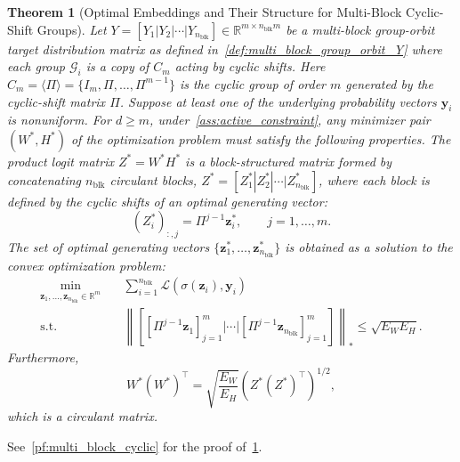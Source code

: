\documentclass[11pt]{article}
\newtheorem{theorem}{Theorem}
\begin{document}
\begin{theorem}[Optimal Embeddings and Their Structure for Multi-Block Cyclic-Shift Groups]
\label{thm:multi_block_cyclic}
Let \( Y = [Y_1 | Y_2 | \cdots | Y_{n_{\mathrm{blk}}}] \in \mathbb{R}^{m \times n_{\mathrm{blk}}m} \) be a multi-block group-orbit target distribution matrix as defined in~\cref{def:multi_block_group_orbit_Y} where each group \( \mathcal G_i \) is a copy of \(C_m\) acting by cyclic shifts.
Here \(C_m=\langle\Pi\rangle=\{I_m,\Pi,\ldots,\Pi^{m-1}\}\) is the cyclic group of order \(m\) generated by the cyclic-shift matrix \(\Pi\).
Suppose at least one of the underlying probability vectors \(\boldsymbol{y}_i\) is nonuniform. For \(d \ge m\), under~\cref{ass:active_constraint}, any minimizer pair \((W^*,H^*)\) of the optimization problem must satisfy the following properties.
The product logit matrix \(Z^*=W^*H^*\) is a block-structured matrix formed by concatenating \(n_{\mathrm{blk}}\) circulant blocks, \(Z^* = [Z_1^* | Z_2^* | \cdots | Z_{n_{\mathrm{blk}}}^*]\), where each block is defined by the cyclic shifts of an optimal generating vector:
\[ (Z_i^*)_{:,j}=\Pi^{j-1}\boldsymbol z_i^*,\qquad j=1,\ldots,m. \]
The set of optimal generating vectors \(\{\boldsymbol{z}_{1}^*, \ldots, \boldsymbol{z}_{n_{\mathrm{blk}}}^*\}\) is obtained as a solution to the convex optimization problem:
\[
\begin{aligned}
\min_{\boldsymbol{z}_{1}, \ldots, \boldsymbol{z}_{n_{\mathrm{blk}}} \in \mathbb{R}^m} \quad & \sum_{i=1}^{n_{\mathrm{blk}}} \mathcal L \left(\sigma(\boldsymbol{z}_{i}), \boldsymbol{y}_i\right) \\
\text{s.t.} \quad & \left\| [ [\Pi^{j-1} \boldsymbol{z}_{1}]_{j=1}^{m} | \cdots | [\Pi^{j-1} \boldsymbol{z}_{n_{\mathrm{blk}}}]_{j=1}^{m} ] \right\|_* \le \sqrt{E_W E_H}.
\end{aligned}
\]
Furthermore,
\[ W^*(W^*)^\top = \sqrt{\frac{E_W}{E_H}} (Z^* (Z^*)^\top)^{1/2}, \]
which is a circulant matrix.
\end{theorem}

See~\cref{pf:multi_block_cyclic} for the proof of~\cref{thm:multi_block_cyclic}.
\end{document}

